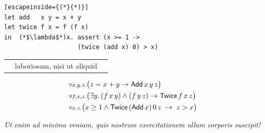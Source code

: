 \documentclass{beamer}
\begin{document}
\begin{frame}[fragile]

  \vspace*{3mm}
  {\large 
    \begin{lstlisting}[escapeinside={(*}{*)}]
let add   x y = x + y
let twice f x = f (f x)
in  (*$\lambda$*)x. assert (x >= 1 ->
                    (twice (add x) 0) > x)
\end{lstlisting}
}
  \vspace{0.5cm}

  \renewcommand\tabularxcolumn[1]{m{#1}}
  \begin{tabularx}{\textwidth}{ RcL }
     &
     laboriosam, nisi ut aliquid
    &
  \end{tabularx}

  \Large
  \vspace{-0.2cm}
    \[
      \begin{array}{l}
        {\scriptstyle\forall x, y, z\ldotp\big(}z = x + y \to \mathsf{Add}\,  x \, y \, z {\scriptstyle\big)} \\[4pt]
        {\scriptstyle\forall f, x,z\ldotp \big(} \exists y\ldotp
        (f \, x \, y)\land (f\,y\,z) \to \mathsf{Twice} \, f \, x\,z {\scriptstyle\big)}\\[4pt]
        {\scriptstyle\forall x,z\ldotp \big (} x \geq 1 \wedge \mathsf{Twice} \, (\mathsf{Add}\,x) \, 0\,z\; \to \; z > x {\scriptstyle\big)}
      \end{array}
    \]
    
\end{frame}


\begin{frame}
  
  {\LARGE
    \color{oxlighterblue}
    \textit{Ut enim ad minima \emph{veniam}, quis nostrum exercitationem ullam corporis suscipit!}
  
}
  
\end{frame}
\end{document}
